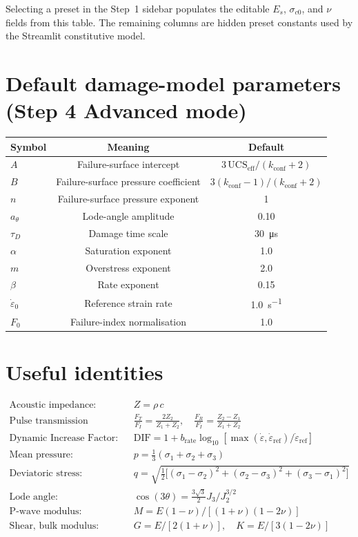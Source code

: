 \documentclass[11pt,a4paper,openany]{book}
\providecommand{\SI}[2]{\qty{#1}{#2}}
\theoremstyle{handbook}
\newcommand{\sig}{\sigma}
\newcommand{\eps}{\varepsilon}
\newcommand{\epsdot}{\dot\eps}
\begin{document}
Selecting a preset in the Step~1 sidebar populates the editable
$E_s$, $\sig_{c0}$, and $\nu$ fields from this table. The remaining
columns are hidden preset constants used by the Streamlit constitutive
model.

\section{Default damage-model parameters (Step 4 Advanced mode)}
\begin{center}
\renewcommand{\arraystretch}{1.3}
\begin{tabular}{@{}lcc@{}}
\toprule
\textbf{Symbol} & \textbf{Meaning} & \textbf{Default} \\
\midrule
$A$ & Failure-surface intercept & $3\,\text{UCS}_{\text{eff}}/(k_{\text{conf}}+2)$ \\
$B$ & Failure-surface pressure coefficient & $3(k_{\text{conf}}-1)/(k_{\text{conf}}+2)$ \\
$n$ & Failure-surface pressure exponent & 1 \\
$a_\theta$ & Lode-angle amplitude & 0.10 \\
$\tau_D$ & Damage time scale & \SI{30}{\micro s} \\
$\alpha$ & Saturation exponent & 1.0 \\
$m$ & Overstress exponent & 2.0 \\
$\beta$ & Rate exponent & 0.15 \\
$\epsdot_0$ & Reference strain rate & \SI{1.0}{s^{-1}} \\
$F_0$ & Failure-index normalisation & 1.0 \\
\bottomrule
\end{tabular}
\end{center}

\section{Useful identities}
\begin{align*}
  \text{Acoustic impedance:}\quad & Z=\rho\,c \\
  \text{Pulse transmission (Fresnel):}\quad
    & \frac{F_T}{F_I}=\frac{2Z_2}{Z_1+Z_2},
      \quad \frac{F_R}{F_I}=\frac{Z_2-Z_1}{Z_1+Z_2} \\
  \text{Dynamic Increase Factor:}\quad
    & \text{DIF}=1+b_{\text{rate}}\log_{10}
      \!\left[\max(\epsdot,\epsdot_{\text{ref}})/\epsdot_{\text{ref}}\right] \\
  \text{Mean pressure:}\quad & p=\tfrac{1}{3}(\sig_1+\sig_2+\sig_3) \\
  \text{Deviatoric stress:}\quad
    & q=\sqrt{\tfrac{1}{2}\bigl[(\sig_1-\sig_2)^{2}+(\sig_2-\sig_3)^{2}+(\sig_3-\sig_1)^{2}\bigr]} \\
  \text{Lode angle:}\quad
    & \cos(3\theta)=\tfrac{3\sqrt{3}}{2}J_3/J_2^{3/2} \\
  \text{P-wave modulus:}\quad
    & M=E(1-\nu)/[(1+\nu)(1-2\nu)] \\
  \text{Shear, bulk modulus:}\quad
    & G=E/[2(1+\nu)],\quad K=E/[3(1-2\nu)]
\end{align*}
\end{document}
